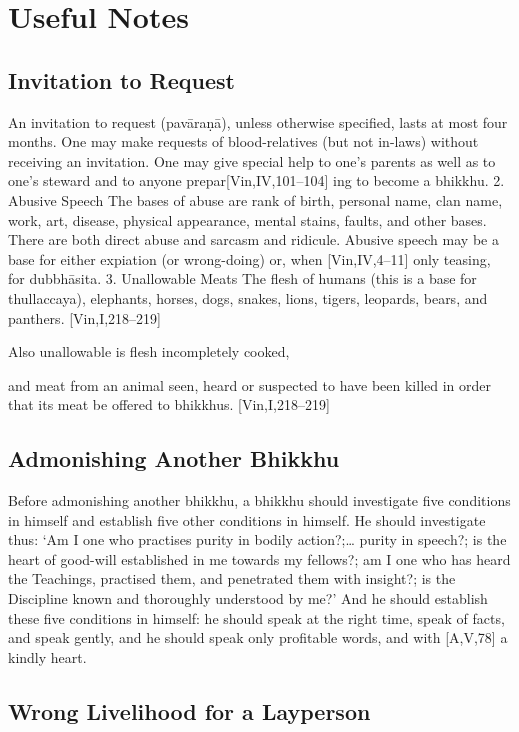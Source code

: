 \chapter{Useful Notes}

\section{Invitation to Request}

An invitation to request (pavāraṇā), unless
otherwise specified, lasts at most four months.
One may make requests of blood-relatives (but
not in-laws) without receiving an invitation.
One may give special help to one's parents as
well as to one's steward and to anyone prepar[Vin,IV,101–104]
ing to become a bhikkhu.
2. Abusive Speech
The bases of abuse are rank of birth, personal
name, clan name, work, art, disease, physical
appearance, mental stains, faults, and other
bases. There are both direct abuse and sarcasm
and ridicule. Abusive speech may be a base for
either expiation (or wrong-doing) or, when
[Vin,IV,4–11]
only teasing, for dubbhāsita.
3. Unallowable Meats
The flesh of humans (this is a base for thullaccaya), elephants, horses, dogs, snakes, lions,
tigers, leopards, bears, and panthers.
[Vin,I,218–219]

Also unallowable is flesh incompletely cooked,

and meat from an animal seen, heard or suspected to have been killed in order that its meat
be offered to bhikkhus.
[Vin,I,218–219]

\section{Admonishing Another Bhikkhu}

Before admonishing another bhikkhu, a
bhikkhu should investigate five conditions in
himself and establish five other conditions in
himself.
He should investigate thus: ‘Am I one who
practises purity in bodily action?;… purity in
speech?; is the heart of good-will established
in me towards my fellows?; am I one who has
heard the Teachings, practised them, and penetrated them with insight?; is the Discipline
known and thoroughly understood by me?’
And he should establish these five conditions
in himself: he should speak at the right time,
speak of facts, and speak gently, and he
should speak only profitable words, and with
[A,V,78]
a kindly heart.

\section{Wrong Livelihood for a Layperson}

